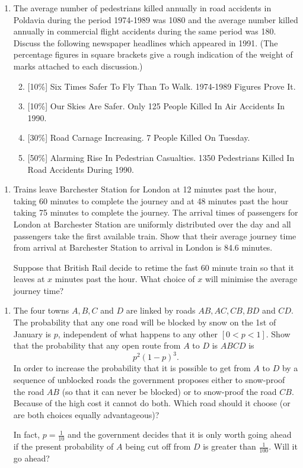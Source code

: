 \documentclass[a4, 11pt]{report}
\newlength{\qspace}
\newcounter{qnumber}
\newenvironment{question}%
 {\vspace{\qspace}
  \begin{enumerate}[\bfseries 1\quad][10]%
    \setcounter{enumi}{\value{qnumber}}%
    \item%
 }
{
  \end{enumerate}
  \filbreak
  \stepcounter{qnumber}
 }
\newenvironment{questionparts}[1][1]%
 {
  \begin{enumerate}[\bfseries (i)]%
    \setcounter{enumii}{#1}
    \addtocounter{enumii}{-1}
    \setlength{\itemsep}{5mm}
    \setlength{\parskip}{8pt}
 }
 {
  \end{enumerate}
 }
\begin{document}
\begin{question}
The average number of pedestrians killed annually in road accidents
in Poldavia during the period 1974-1989 was 1080 and the average number
killed annually in commercial flight accidents during the same period
was 180. Discuss the following newspaper headlines which appeared
in 1991. (The percentage figures in square brackets give a rough indication
of the weight of marks attached to each discussion.)
\begin{questionparts}
\item {[}10\%{]} Six Times Safer To Fly Than To Walk. 1974-1989 Figures
Prove It.
\item {[}10\%{]} Our Skies Are Safer. Only 125 People Killed In Air
Accidents In 1990. 
\item {[}30\%{]} Road Carnage Increasing. 7 People Killed On Tuesday.
\item {[}50\%{]} Alarming Rise In Pedestrian Casualties. 1350 Pedestrians
Killed In Road Accidents During 1990.
\end{questionparts}
\end{question}



\begin{question}
Trains leave Barchester Station for London at 12 minutes past the
hour, taking 60 minutes to complete the journey and at 48 minutes
past the hour taking 75 minutes to complete the journey. The arrival
times of passengers for London at Barchester Station are uniformly
distributed over the day and all passengers take the first available
train. Show that their average journey time from arrival at Barchester
Station to arrival in London is 84.6 minutes. 


Suppose that British Rail decide to retime the fast 60 minute train
so that it leaves at $x$ minutes past the hour. What choice of $x$
will minimise the average journey time? 
\end{question}

\begin{question}
The four towns $A,B,C$ and $D$ are linked by roads $AB,AC,CB,BD$
and $CD.$ The probability that any one road will be blocked by snow
on the 1st of January is $p$, independent of what happens to any
other $[0<p<1]$. Show that the probability that any open route from
$A$ to $D$ is $ABCD$ is 
\[
p^{2}(1-p)^{3}.
\]
In order to increase the probability that it is possible to get from
$A$ to $D$ by a sequence of unblocked roads the government proposes
either to snow-proof the road $AB$ (so that it can never be blocked)
or to snow-proof the road $CB.$ Because of the high cost it cannot
do both. Which road should it choose (or are both choices equally
advantageous)? 


In fact, $p=\frac{1}{10}$ and the government decides that it is only
worth going ahead if the present probability of $A$ being cut off
from $D$ is greater than $\frac{1}{100}.$ Will it go ahead?
\end{question}
\end{document}
